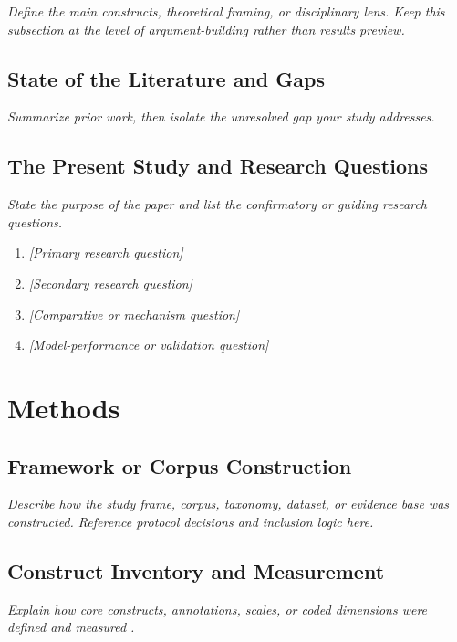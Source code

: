 \documentclass[12pt,a4paper]{article}
\newcommand{\placeholder}[1]{\textit{#1}}
\begin{document}
\placeholder{Define the main constructs, theoretical framing, or disciplinary lens. Keep this subsection at the level of argument-building rather than results preview.}

\subsection{State of the Literature and Gaps}

\placeholder{Summarize prior work, then isolate the unresolved gap your study addresses.}

\subsection{The Present Study and Research Questions}

\placeholder{State the purpose of the paper and list the confirmatory or guiding research questions.}

\begin{enumerate}[label=RQ\arabic*.,leftmargin=2.8em]
  \item \placeholder{[Primary research question]}
  \item \placeholder{[Secondary research question]}
  \item \placeholder{[Comparative or mechanism question]}
  \item \placeholder{[Model-performance or validation question]}
\end{enumerate}

\section{Methods}

\subsection{Framework or Corpus Construction}

\placeholder{Describe how the study frame, corpus, taxonomy, dataset, or evidence base was constructed. Reference protocol decisions and inclusion logic here.}

\subsection{Construct Inventory and Measurement}

\placeholder{Explain how core constructs, annotations, scales, or coded dimensions were defined and measured \citep{placeholder_method}.}
\end{document}
